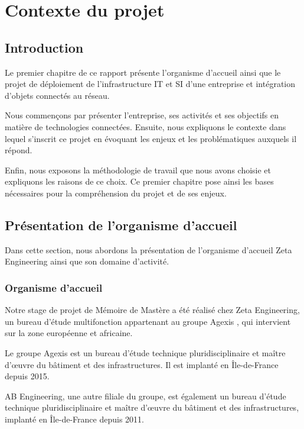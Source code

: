 \chapter{Contexte du projet}


\section{Introduction}
Le premier chapitre de ce rapport présente l'organisme d'accueil ainsi que le projet de déploiement de l'infrastructure IT et SI d'une entreprise et intégration d'objets connectés au réseau.

Nous commençons par présenter l'entreprise, ses activités et ses objectifs en matière de technologies connectées. Ensuite, nous expliquons le contexte dans lequel s'inscrit ce projet en évoquant les enjeux et les problématiques auxquels il répond.

Enfin, nous exposons la méthodologie de travail que nous avons choisie et expliquons les raisons de ce choix. Ce premier chapitre pose ainsi les bases nécessaires pour la compréhension du projet et de ses enjeux.


\section{Présentation de l'organisme d'accueil }

Dans cette section, nous abordons la présentation de l'organisme d'accueil Zeta Engineering ainsi que son domaine d'activité.

\subsection{Organisme d'accueil}


Notre stage de projet de Mémoire de Mastère a été réalisé chez Zeta Engineering, un bureau d'étude multifonction appartenant au groupe Agexis \cite{agexis}, qui intervient sur la zone européenne et africaine. 

Le groupe Agexis est un bureau d'étude technique pluridisciplinaire et maître d'œuvre du bâtiment et des infrastructures. Il est implanté en Île-de-France depuis 2015. 


AB Engineering, une autre filiale du groupe, est également un bureau d'étude technique pluridisciplinaire et maître d'œuvre du bâtiment et des infrastructures, implanté en Île-de-France depuis 2011.


